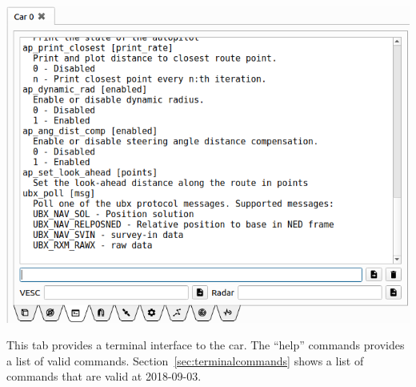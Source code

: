 \documentclass[12pt]{article} %
\begin{document}
\noindent\begin{minipage}{0.5\textwidth}
  \noindent \includegraphics[width=\textwidth]{./screens/Car_terminal.png}
\end{minipage}
\begin{minipage}{0.5\textwidth} %
  This tab provides a terminal interface to the car. The ``help'' commands provides a list
  of valid commands. Section~\ref{sec:terminalcommands} shows a list of commands that
  are valid at 2018-09-03. 
\end{minipage}


\end{document}
